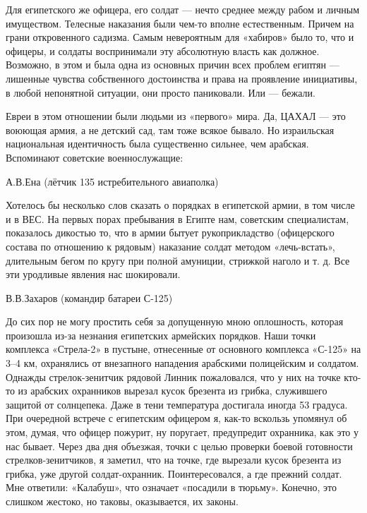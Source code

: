 Для египетского же офицера, его солдат — нечто среднее между рабом и личным имуществом. Телесные наказания были чем-то вполне естественным. Причем на грани откровенного садизма. Самым невероятным для «хабиров» было то, что и офицеры, и солдаты воспринимали эту абсолютную власть как должное. Возможно, в этом и была одна из основных причин всех проблем египтян — лишенные чувства собственного достоинства и права на проявление инициативы, в любой непонятной ситуации, они просто паниковали. Или — бежали.

Евреи в этом отношении были людьми из «первого» мира. Да, ЦАХАЛ — это воюющая армия, а не детский сад, там тоже всякое бывало. Но израильская национальная идентичность была существенно сильнее, чем арабская.
Вспоминают советские военнослужащие:

А.В.Ена (лётчик 135 истребительного авиаполка)

\begin{textcitation}
	Хотелось бы несколько слов сказать о порядках в египетской армии, в том числе и в ВЕС. На первых порах пребывания в Египте нам, советским специалистам, показалось дикостью то, что в армии бытует рукоприкладство (офицерского состава по отношению к рядовым) наказание солдат методом «лечь-встать», длительным бегом по кругу при полной амуниции, стрижкой наголо и т. д. Все эти уродливые явления нас шокировали.
\end{textcitation}

В.В.Захаров (командир батареи С-125)

\begin{textcitation}
	До сих пор не могу простить себя за допущенную мною оплошность, которая произошла из-за незнания египетских армейских порядков. Наши точки комплекса «Стрела-2» в пустыне, отнесенные от основного комплекса «С-125» на 3–4 км, охранялись от внезапного нападения арабскими полицейским и солдатом. Однажды стрелок-зенитчик рядовой Линник пожаловался, что у них на точке кто-то из арабских охранников вырезал кусок брезента из грибка, служившего защитой от солнцепека. Даже в тени температура достигала иногда 53 градуса. При очередной встрече с египетским офицером я, как-то вскользь упомянул об этом, думая, что офицер пожурит, ну поругает, предупредит охранника, как это у нас бывает. Через два дня объезжая, точки с целью проверки боевой готовности стрелков-зенитчиков, я заметил, что на точке, где вырезали кусок брезента из грибка, уже другой солдат-охранник. Поинтересовался, а где прежний солдат. Мне ответили: «Калабуш», что означает «посадили в тюрьму». Конечно, это слишком жестоко, но таковы, оказывается, их законы.
\end{textcitation}

